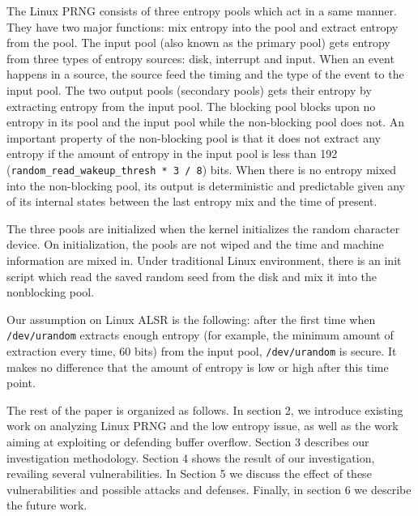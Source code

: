 The Linux PRNG consists of three entropy pools which act in a same manner. They have two major functions: mix entropy into the pool and extract entropy from the pool. The input pool (also known as the primary pool) gets entropy from three types of entropy sources: disk, interrupt and input. When an event happens in a source, the source feed the timing and the type of the event to the input pool. The two output pools (secondary pools) gets their entropy by extracting entropy from the input pool. The blocking pool blocks upon no entropy in its pool and the input pool while the non-blocking pool does not. An important property of the non-blocking pool is that it does not extract any entropy if the amount of entropy in the input pool is less than 192 (\verb|random_read_wakeup_thresh * 3 / 8|) bits. When there is no entropy mixed into the non-blocking pool, its output is deterministic and predictable given any of its internal states between the last entropy mix and the time of present. 

The three pools are initialized when the kernel initializes the random character device. On initialization, the pools are not wiped and the time and machine information are mixed in. Under traditional Linux environment, there is an init script which read the saved random seed from the disk and mix it into the nonblocking pool.

Our assumption on Linux ALSR is the following: after the first time when \verb|/dev/urandom| extracts enough entropy (for example, the minimum amount of extraction every time, 60 bits) from the input pool, \verb|/dev/urandom| is secure. It makes no difference that the amount of entropy is low or high after this time point. 


The rest of the paper is organized as follows. In section 2, we introduce existing work on analyzing Linux PRNG and the low entropy issue, as well as the work aiming at exploiting or defending buffer overflow. Section 3 describes our investigation methodology. Section 4 shows the result of our investigation, revailing several vulnerabilities. In Section 5 we discuss the effect of these vulnerabilities and possible attacks and defenses. Finally, in section 6 we describe the future work.
